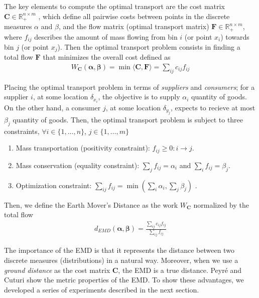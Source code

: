 The key elements to compute the optimal transport are the cost matrix $\mathbf{C} \in \mathbb{R}^{n\times m}_+$ , which define all pairwise costs between points in the discrete measures $\alpha$ and $\beta$, and the flow matrix (optimal transport matrix) $\mathbf{F} \in \mathbb{R}^{n\times m}_+$, where $f_{ij}$ describes the amount of mass flowing from bin $i$ (or point $x_i$) towards bin $j$ (or point $x_j$). Then the optimal transport problem consists in finding a total flow $\mathbf{F}$ that minimizes the overall cost defined as
\begin{eqnarray}
W_{\mathbf{C}}(\boldsymbol{\alpha}, \boldsymbol{\beta}) = \min \langle\mathbf{C},\mathbf{F}\rangle = \sum\nolimits_{ij} c_{ij}f_{ij}
\label{eq:optimal_work}
\end{eqnarray}

Placing the optimal transport problem in terms of \textit{suppliers} and \textit{consumers}; for a supplier $i$, at some location $\delta_{x_i}$, the objective is to supply $\alpha_i$ quantity of goods. On the other hand, a consumer $j$, at some location $\delta_{y_j}$, expects to recieve at most $\beta_j$ quantity of goods. Then, the optimal transport problem is subject to three constraints, $\forall i \in\{1, \ldots, n\}$, $j \in\{1, \ldots, m\}$

\begin{enumerate}%
 \item Mass transportation (positivity constraint): $f_{ij} \geq 0 : i\rightarrow j$.
 \item Mass conservation (equality constraint):  $\sum_{j}f_{ij}=\alpha_i$ and $\sum_{i}f_{ij}= \beta_j$.
 \item Optimization constraint: $\sum_{ij}f_{ij} = \min \left( \sum_{i}\alpha_i, \sum_{j}\beta_j \right)$ .
\end{enumerate}  

Then, we define the Earth Mover's Distance as the work $W_{\mathbf{C}}$ normalized by the total flow
\begin{eqnarray}
d_{EMD}(\boldsymbol{\alpha}, \boldsymbol{\beta}) = \frac{\sum_{ij}c_{ij}f_{ij}}{\sum_{ij}f_{ij}}
\label{eq:emd}
\end{eqnarray}

The importance of the EMD is that it represents the distance between two discrete measures (distributions) in a natural way. Moreover, when we use a \textit{ground distance} as the cost matrix $\mathbf{C}$, the EMD is a true distance. Peyré and Cuturi \citep{Peyre.Cuturi:arXiv:2018} show the metric properties of the EMD. To show these advantages, we developed a series of experiments described in the next section.



